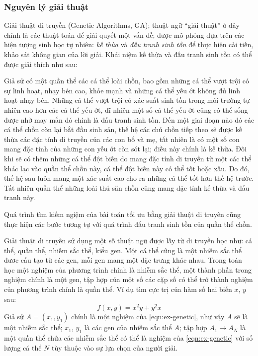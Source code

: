 \documentclass[12pt,a4paper]{report}
\begin{document}
\subsubsection{Nguyên lý giải thuật}
Giải thuật di truyền (Genetic Algorithms, GA); thuật ngữ ``giải thuật'' ở đây chính là các thuật toán để giải quyết một vấn đề; được mô phỏng dựa trên các hiện tượng sinh học tự nhiên: \textit{kế thừa} và \textit{đấu tranh sinh tồn} để thực hiện cải tiến, khảo sát không gian của lời giải. Khái niệm kế thừa và đấu tranh sinh tồn có thể được giải thích như sau:

Giả sử có một quần thể các cá thể loài chồn, bao gồm những cá thể vượt trội có sự linh hoạt, nhạy bén cao, khỏe mạnh và những cá thể yếu ớt không đủ linh hoạt nhạy bén. Những cá thể vượt trội có xác suất sinh tồn trong môi trường tự nhiên cao hơn các cá thể yếu ớt, dĩ nhiên một số cá thể yếu ớt cũng có thể sống được nhờ may mắn đó chính là đấu tranh sinh tồn. Đến một giai đoạn nào đó các cá thể chồn còn lại bắt đầu sinh sản, thế hệ các chú chồn tiếp theo sẽ được kế thừa các đặc tính di truyền của các con bố và mẹ, tất nhiên là có một số con mang đặc tính của những con yếu ớt còn sót lại; điều này chính là kế thừa. Đôi khi sẽ có thêm những cá thể đột biến do mang đặc tính di truyền từ một các thể khác lạc vào quần thể chồn này, cá thể đột biến này có thể tốt hoặc xấu. Do đó, thế hệ sau luôn mang một xác suất cao cho ra những cá thể tốt hơn thế hệ trước. Tất nhiên quần thể những loài thú săn chồn cũng mang đặc tính kế thừa và đấu tranh này.

Quá trình tìm kiếm ngiệm của bài toán tối ưu bằng giải thuật di truyên cũng thực hiện các bước tương tự với quá trình đấu tranh sinh tồn của quần thể chồn. 

Giải thuật di truyền sử dụng một số thuật ngữ được lấy từ di truyền học như: cá thể, quần thể, nhiễm sắc thể, kiểu gen. Một cá thể cũng là một nhiễm sắc thể đươc cấu tạo từ các gen, mỗi gen mang một đặc trưng khác nhau. Trong toán học một nghiệm của phương trình chính là nhiễm sắc thể, một thành phần trong nghiệm chính là một gen, tập hợp của một số các cặp số có thể trở thành nghiệm của phương trình chính là quần thể. Ví dụ tìm cực trị của hàm số hai biến $x$, $y$ sau:
	\begin{equation}\label{eqn:ex-genetic}
		f(x, y) = x^2y + y^2x
	\end{equation}
Giả sử $A = (x_1, y_1)$ chính là một nghiệm của \ref{eqn:ex-genetic}, như vậy $A$ sẽ là một nhiễm sắc thể; $x_1$, $y_1$ là các gen của nhiễm sắc thể $A$; tập hợp $A_1 \to A_N$ là một quần thể chứa các nhiễm sắc thể có thể là nghiệm của \ref{eqn:ex-genetic} với số lượng cá thể $N$ tùy thuộc vào sự lựa chọn của người giải.\\
\end{document}
